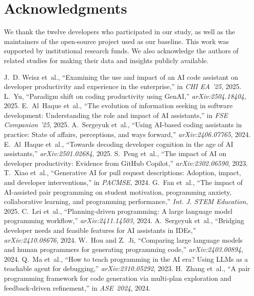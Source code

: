 \documentclass[conference]{IEEEtran}
\begin{document}
\section*{Acknowledgments}
We thank the twelve developers who participated in our study, as well as the maintainers of the open‑source project used as our baseline.  This work was supported by institutional research funds.  We also acknowledge the authors of related studies for making their data and insights publicly available.

\begin{thebibliography}{99}
 J.~D. Weisz et~al., “Examining the use and impact of an AI code assistant on developer productivity and experience in the enterprise,” in \emph{CHI EA ’25}, 2025.
 L.~Yu, “Paradigm shift on coding productivity using GenAI,” \emph{arXiv:2504.18404}, 2025.
 E.~Al~Haque et~al., “The evolution of information seeking in software development: Understanding the role and impact of AI assistants,” in \emph{FSE Companion ’25}, 2025.
 A.~Sergeyuk et~al., “Using AI-based coding assistants in practice: State of affairs, perceptions, and ways forward,” \emph{arXiv:2406.07765}, 2024.
 E.~Al~Haque et~al., “Towards decoding developer cognition in the age of AI assistants,” \emph{arXiv:2501.02684}, 2025.
 S.~Peng et~al., “The impact of AI on developer productivity: Evidence from GitHub Copilot,” \emph{arXiv:2302.06590}, 2023.
 T.~Xiao et~al., “Generative AI for pull request descriptions: Adoption, impact, and developer interventions,” in \emph{PACMSE}, 2024.
 G.~Fan et~al., “The impact of AI-assisted pair programming on student motivation, programming anxiety, collaborative learning, and programming performance,” \emph{Int. J. STEM Education}, 2025.
 C.~Lei et~al., “Planning-driven programming: A large language model programming workflow,” \emph{arXiv:2411.14503}, 2024.
 A.~Sergeyuk et~al., “Bridging developer needs and feasible features for AI assistants in IDEs,” \emph{arXiv:2410.08676}, 2024.
 W.~Hou and Z.~Ji, “Comparing large language models and human programmers for generating programming code,” \emph{arXiv:2403.00894}, 2024.
 Q.~Ma et~al., “How to teach programming in the AI era? Using LLMs as a teachable agent for debugging,” \emph{arXiv:2310.05292}, 2023.
 H.~Zhang et al., “A pair programming framework for code generation via multi‑plan exploration and feedback‑driven refinement,” in \emph{ASE 2024}, 2024.

\end{thebibliography}
\end{document}
